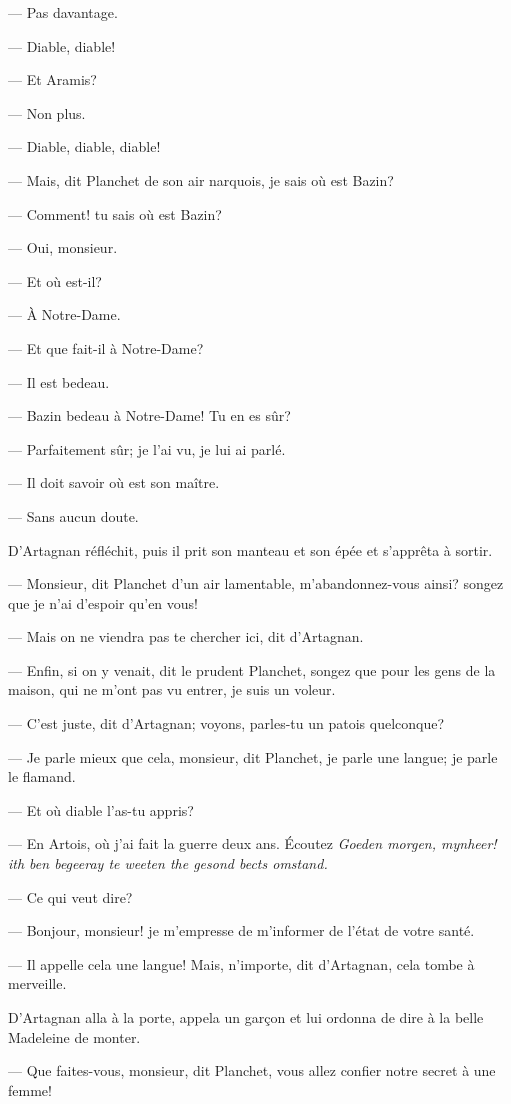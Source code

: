 — Pas davantage.

— Diable, diable!

— Et Aramis?

— Non plus.

— Diable, diable, diable!

— Mais, dit Planchet de son air narquois, je sais où est Bazin?

— Comment! tu sais où est Bazin?

— Oui, monsieur.

— Et où est-il?

— À Notre-Dame.

— Et que fait-il à Notre-Dame?

— Il est bedeau.

— Bazin bedeau à Notre-Dame! Tu en es sûr?

— Parfaitement sûr; je l'ai vu, je lui ai parlé.

— Il doit savoir où est son maître.

— Sans aucun doute.

D'Artagnan réfléchit, puis il prit son manteau et son épée et s'apprêta à sortir.

— Monsieur, dit Planchet d'un air lamentable, m'abandonnez-vous ainsi? songez que je n'ai d'espoir qu'en vous!

— Mais on ne viendra pas te chercher ici, dit d'Artagnan.

— Enfin, si on y venait, dit le prudent Planchet, songez que pour les gens de la maison, qui ne m'ont pas vu entrer, je suis un voleur.

— C'est juste, dit d'Artagnan; voyons, parles-tu un patois quelconque?

— Je parle mieux que cela, monsieur, dit Planchet, je parle une langue; je parle le flamand.

— Et où diable l'as-tu appris?

— En Artois, où j'ai fait la guerre deux ans. Écoutez \textit{Goeden morgen, mynheer! ith ben begeeray te weeten the gesond bects omstand.}

— Ce qui veut dire?

— Bonjour, monsieur! je m'empresse de m'informer de l'état de votre santé.

— Il appelle cela une langue! Mais, n'importe, dit d'Artagnan, cela tombe à merveille.

D'Artagnan alla à la porte, appela un garçon et lui ordonna de dire à la belle Madeleine de monter.

— Que faites-vous, monsieur, dit Planchet, vous allez confier notre secret à une femme!

